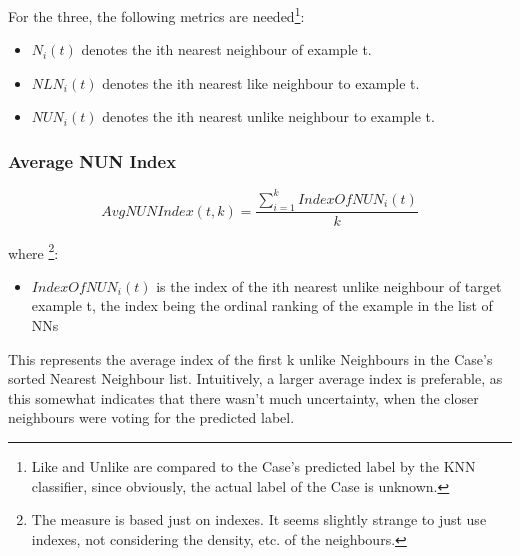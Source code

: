 \documentclass[a4paper,11pt]{report}
\begin{document}
For the three, the following metrics are needed\footnote{Like and Unlike are compared to the Case's predicted label by the KNN classifier, since obviously, the actual label of the Case is unknown.}:
\begin{itemize} 
	\item $N_{i}(t)$ denotes the ith nearest neighbour of example t.
	\item $NLN_{i}(t)$ denotes the ith nearest like neighbour to example t.
	\item $NUN_{i}(t)$ denotes the ith nearest unlike neighbour to example t.
\end{itemize}

\subsubsection{Average NUN Index}

\[
AvgNUNIndex(t,k)=\frac{\sum_{i=1}^{k}IndexOfNUN_{i}(t)}{k}
\]

where \footnote{The measure is based just on indexes. It seems slightly strange to just use indexes, not considering the density, etc. of the neighbours.}:
\begin{itemize}
	\item $IndexOfNUN_{i}(t)$ is the index of the ith nearest unlike neighbour of target example t, the index being the ordinal ranking of the example in the list of NNs
\end{itemize}

This represents the average index of the first k unlike Neighbours in the Case's sorted Nearest Neighbour list. Intuitively, a larger average index is preferable, as this somewhat indicates that there wasn't much uncertainty, when the closer neighbours were voting for the predicted label.
\vspace{10pt}
\end{document}

